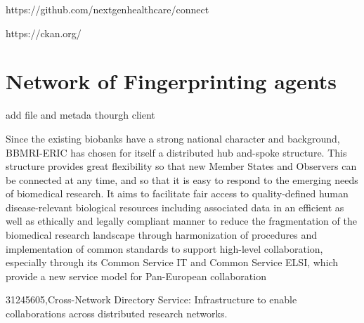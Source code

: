 https://github.com/nextgenhealthcare/connect

https://ckan.org/

\section{Network of Fingerprinting agents}
\cite{egenvar}
add file and metada thourgh client

\cite{datasphere}
\cite{ehr4cr}
\cite{popmed}
\cite{gaain}

\cite{bbmieric} Since the existing biobanks have a strong national character and background, BBMRI-ERIC has chosen for itself a distributed hub and-spoke structure. This structure provides great flexibility so that new Member States and Observers can be connected at any time, and so that it is easy to respond to the emerging needs of biomedical research. It aims to facilitate fair access to quality-defined human disease-relevant biological resources including associated data in an efficient as well as ethically and legally compliant manner to reduce the fragmentation of the biomedical research landscape through harmonization of procedures and implementation of common standards to support high-level collaboration, especially through its Common Service IT and Common Service ELSI, which provide a new service model for Pan-European collaboration

31245605,Cross-Network Directory Service: Infrastructure to enable collaborations across distributed research networks.
